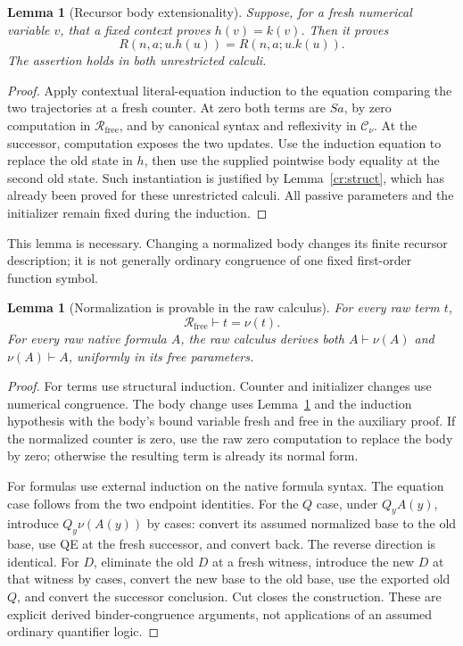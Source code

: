 \documentclass[11pt]{article}
\newtheorem{lemma}[theorem]{Lemma}
\theoremstyle{definition}\newtheorem{definition}[theorem]{Definition}
\newcommand{\norm}[1]{\nu(#1)}
\newcommand{\Rfree}{\mathcal R_{\mathrm{free}}}
\newcommand{\Cnorm}{\mathcal C_\nu}
\begin{document}
\begin{lemma}[Recursor body extensionality]\label{cr:body}
Suppose, for a fresh numerical variable \(v\), that a fixed context proves \(h(v)=k(v)\). Then it proves
\[
R(n,a;u.h(u))=R(n,a;u.k(u)).
\]
The assertion holds in both unrestricted calculi.
\end{lemma}
\begin{proof}
Apply contextual literal-equation induction to the equation comparing the two trajectories at a fresh counter. At zero both terms are \(Sa\), by zero computation in \(\Rfree\), and by canonical syntax and reflexivity in \(\Cnorm\). At the successor, computation exposes the two updates. Use the induction equation to replace the old state in \(h\), then use the supplied pointwise body equality at the second old state. Such instantiation is justified by Lemma~\ref{cr:struct}, which has already been proved for these unrestricted calculi. All passive parameters and the initializer remain fixed during the induction.
\end{proof}

This lemma is necessary. Changing a normalized body changes its finite recursor description; it is not generally ordinary congruence of one fixed first-order function symbol.

\begin{lemma}[Normalization is provable in the raw calculus]\label{cr:normal-eq}
For every raw term \(t\),
\[
\Rfree\vdash t=\norm t.
\]
For every raw native formula \(A\), the raw calculus derives both
\(A\vdash\norm A\) and \(\norm A\vdash A\), uniformly in its free parameters.
\end{lemma}
\begin{proof}
For terms use structural induction. Counter and initializer changes use numerical congruence. The body change uses Lemma~\ref{cr:body} and the induction hypothesis with the body's bound variable fresh and free in the auxiliary proof. If the normalized counter is zero, use the raw zero computation to replace the body by zero; otherwise the resulting term is already its normal form.

For formulas use external induction on the native formula syntax. The equation case follows from the two endpoint identities. For the \(Q\) case, under \(Q_yA(y)\), introduce \(Q_y\norm{A(y)}\) by cases: convert its assumed normalized base to the old base, use QE at the fresh successor, and convert back. The reverse direction is identical. For \(D\), eliminate the old \(D\) at a fresh witness, introduce the new \(D\) at that witness by cases, convert the new base to the old base, use the exported old \(Q\), and convert the successor conclusion. Cut closes the construction. These are explicit derived binder-congruence arguments, not applications of an assumed ordinary quantifier logic.
\end{proof}
\end{document}
